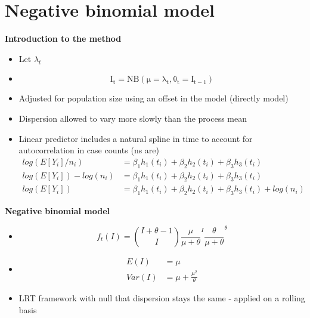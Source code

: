 \documentclass{beamer}
\begin{document}
\section{Negative binomial model}
\begin{frame}{\textbf{Introduction to the method}}
	\begin{itemize}[<+-| alert@+>] 
		\item Let \begin{math}\lambda_t\end{math} 
		\item \begin{equation}
			\mathrm{I_t = NB(\mu = \lambda_t, \theta_t = I_{t-1})}
		\end{equation}
		\item Adjusted for population size using an offset in the model (directly model)
		\item Dispersion allowed to vary more slowly than the process mean
		\item Linear predictor includes a natural spline in time to account for autocorrelation in case counts (ns are)
		\begin{align}
			log(E[Y_i]/n_i) &= \beta_1h_1(t_i) + \beta_2h_2(t_i) + \beta_3h_3(t_i) \\
			log(E[Y_i])-log(n_i) &= \beta_1h_1(t_i) + \beta_2h_2(t_i) + \beta_3h_3(t_i) \\ 
			log(E[Y_i]) &= \beta_1h_1(t_i) + \beta_2h_2(t_i) + \beta_3h_3(t_i) + log(n_i) 
		\end{align}
	\end{itemize}
\end{frame}

\begin{frame}{\textbf{Negative binomial model}}
	\begin{itemize}[<+-| alert@+>] 
		\item \begin{equation}
			f_t(I) = \binom{I + \theta - 1}{I} \frac{\mu}{\mu+\theta}^I \frac{\theta}{\mu +\theta}^\theta
		\end{equation}
		\item \begin{align}
		E(I) &= \mu\\
		Var(I) &= \mu + \frac{\mu^2}{\theta}
	\end{align}
	\item LRT framework with null that dispersion stays the same - applied on a rolling basis
	\end{itemize}
\end{frame}
\end{document}
